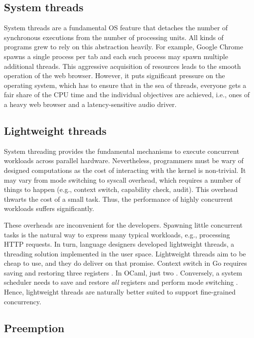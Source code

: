 \documentclass[12pt,a4paper,twoside]{report}
\begin{document}
\subsection{System threads}
\label{section:system-threads}
System threads are a fundamental OS feature that detaches the number of synchronous executions from the number of processing units. All kinds of programs grew to rely on this abstraction heavily. For example, Google Chrome spawns a single process per tab \cite{Howwebbr64:online} and each such process may spawn multiple additional threads. This aggressive acquisition of resources leads to the smooth operation of the web browser. However, it puts significant pressure on the operating system, which has to ensure that in the sea of threads, everyone gets a fair share of the CPU time and the individual objectives are achieved, i.e., ones of a heavy web browser and a latency-sensitive audio driver.



\subsection{Lightweight threads}
\label{section:lightweight-threads}
System threading provides the fundamental mechanisms to execute concurrent workloads across parallel hardware. Nevertheless, programmers must be wary of designed computations as the cost of interacting with the kernel is non-trivial. It may vary from mode switching to syscall overhead, which requires a number of things to happen (e.g., context switch, capability check, audit). This overhead thwarts the cost of a small task. Thus, the performance of highly concurrent workloads suffers significantly.

These overheads are inconvenient for the developers. Spawning little concurrent tasks is the natural way to express many typical workloads, e.g., processing HTTP requests. In turn, language designers developed lightweight threads, a threading solution implemented in the user space. Lightweight threads aim to be cheap to use, and they do deliver on that promise. Context switch in Go requires saving and restoring three registers \cite{gorout_vs_os_thread}. In OCaml, just two \cite{Sivaramakrishnan2021}. Conversely, a system scheduler needs to save and restore \textit{all} registers and perform mode switching \cite{gorout_vs_os_thread}. Hence, lightweight threads are naturally better suited to support fine-grained concurrency. 

\subsection{Preemption}
\label{section:preemption}
\end{document}
